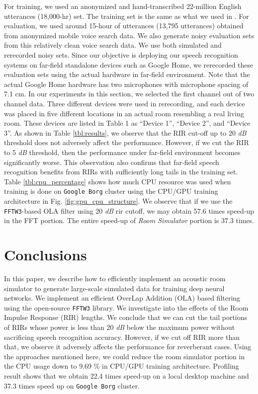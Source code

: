 \documentclass{article}
\begin{document}
For training, we used an anonymized and hand-transcribed
22-million English utterances (18,000-hr) set. The training set is the same as what we
used in \cite{B_Li_INTERSPEECH_2017_1, C_Kim_INTERSPEECH_2017_1}.
For evaluation, we used around 15-hour of utterances (13,795 utterances)
obtained from anonymized mobile voice search data. 
  We also generate noisy evaluation
sets from this relatively clean voice search data.
We use both simulated and rerecorded noisy sets.
Since our objective is deploying our speech recognition
systems on far-field standalone devices such as Google Home,
we rerecorded these evaluation sets using the actual hardware
in far-field environment.
Note that the actual Google Home hardware has two microphones
with microphone spacing of 7.1 cm. In our experiments in this section,
we selected the first channel out of two channel data.
 Three different devices
were used in rerecording, and each device was placed in five
different locations in an actual room resembling a real living
room. These devices are listed in Table 1 as ``Device 1'', ``Device 2'',
and ``Device 3''. As shown in Table \ref{tbl:results},
we observe that the RIR cut-off up to 20 \textit{dB} threshold does not
adversely affect the performance. However, if we cut the
RIR to 5 \textit{dB} threshold, then the performance under far-field
environment becomes significantly worse. This observation also confirms
that far-field speech recognition benefits from
RIRs with sufficiently long tails in the training set.
%
%
Table \ref{tbl:cpu_percentage} shows how much CPU resource was used
when training is done on \texttt{Google Borg} cluster
\cite{A_Verma_eurosys_2015_1} using the CPU/GPU
training architecture in Fig. \ref{fig:gpu_cpu_structure}. We observe that
if we use the \texttt{FFTW3}-based OLA filter using 20 \textit{dB} rir cutoff, we
may obtain 57.6 times speed-up in the FFT portion. The entire speed-up
of \textit{Room Simulator} portion is 37.3 times.
% 
\section{Conclusions}
In this paper, we describe how to efficiently implement
an acoustic room simulator to generate large-scale
simulated data for training deep neural networks.
We implement an efficient OverLap
Addition (OLA) based filtering using the open-source \texttt{FFTW3}
library. We investigate into the effects of the Room
Impulse Response (RIR) lengths. We conclude that we can cut
the tail portions of RIRs whose power is less than 20 \textit{dB}
below the maximum power without sacrificing speech recognition accuracy.
However, if we cut off RIR more than that, we observe it adversely
affects the performance for reverberant cases.
Using the approaches mentioned here, we could reduce the
room simulator portion in the CPU usage down to 9.69 \%
in CPU/GPU training architecture. Profiling result shows that
we obtain 22.4 times speed-up on a local desktop machine and 37.3 times
speed up on \texttt{Google Borg} cluster.
%
%


%
%
\end{document}
